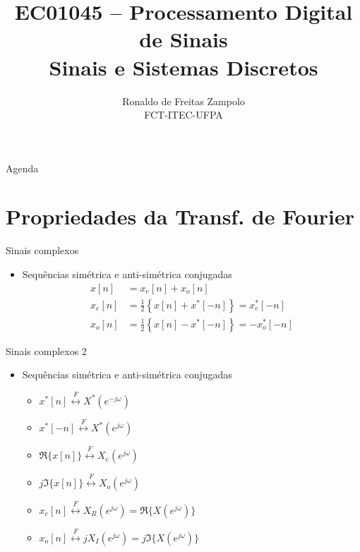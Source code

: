 \documentclass[
size=17pt,
paper=smartboard,
mode=present,
display=slidesnotes,
style=sailor,
nopagebreaks,
blackslide,
fleqn]{powerdot}
\title{\Large EC01045 -- Processamento Digital de Sinais\\ \vspace{1cm}Sinais e Sistemas Discretos}
\author{Ronaldo de Freitas Zampolo\\FCT-ITEC-UFPA}
\date{ }
\begin{document}
   \maketitle[randomdots={false}]
   \begin{slide}[toc=]{Agenda}
      \tableofcontents[content=sections]
   \end{slide}
   
\section[slide=false]{Propriedades da Transf. de Fourier}
\begin{slide}[toc=]{Sinais complexos}
\begin{itemize}
   \item Sequências  simétrica e anti-simétrica conjugadas
   \begin{align*}
      x[n] &= x_e[n]+x_o[n]\\
      x_e[n] &= \frac{1}{2} \left \{ x[n] + x^*[-n] \right \} = x_e^*[-n]\\
      x_o[n] &= \frac{1}{2} \left \{ x[n] - x^*[-n] \right \} = -x_o^*[-n]
   \end{align*} 
\end{itemize}
\end{slide}

\begin{slide}[toc=]{Sinais complexos 2}
\begin{itemize}
   \item Sequências  simétrica e anti-simétrica conjugadas
\begin{itemize}
   \item $x^*[n]\stackrel{F}{\leftrightarrow} X^*(e^{-j\omega})$
   \item $x^*[-n]\stackrel{F}{\leftrightarrow} X^*(e^{j\omega})$
   \item $\Re\{x[n]\} \stackrel{F}{\leftrightarrow} X_e(e^{j\omega})$
   \item $j\Im\{x[n]\} \stackrel{F}{\leftrightarrow} X_o(e^{j\omega})$
   \item $x_e[n] \stackrel{F}{\leftrightarrow} X_R(e^{j\omega}) = \Re\{X(e^{j\omega})\}$
   \item $x_o[n] \stackrel{F}{\leftrightarrow} jX_I(e^{j\omega}) = j\Im\{X(e^{j\omega})\}$
\end{itemize}
\end{itemize}
\end{slide}
\end{document}
